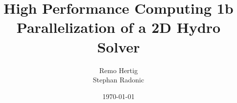 \documentclass{beamer}
\title[HPC 1b]{High Performance Computing 1b \\
Parallelization of a 2D Hydro Solver} %
\author[Hertig, Radonic]{Remo Hertig\\
Stephan Radonic} %
\institute[UZH] %
{
\ %
}
\date{\today} %
\begin{document}
\begin{frame}
\titlepage %
\end{frame}


\end{document}
